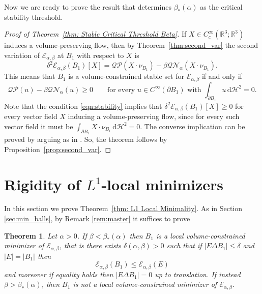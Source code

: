\documentclass[a4paper,11pt,reqno]{amsart}
\numberwithin{equation}{section}
\newtheorem{theorem}{Theorem}[section]
\theoremstyle{remark}
\theoremstyle{definition}
\newcommand{\R}{\mathbb R}
\newcommand{\dd}{\,\mathrm{d}}
\newcommand{\ene}{\mathcal{E}_{\alpha,\beta}}
\newcommand{\nl}{\mathcal{N}_{\alpha}}
\newcommand{\Htwo}{\mathcal{H}^2}
\renewcommand{\leq}{\leqslant}
\renewcommand{\geq}{\geqslant}
\begin{document}
Now we are ready to prove the result that determines $\beta_*(\alpha)$ as the critical stability threshold.

\begin{proof}[Proof of Theorem~\ref{thm: Stable Critical Threshold Beta}]
If $X\in C^\infty_c(\R^3;\R^3)$ induces a volume-preserving flow, then by Theorem~\ref{thm:second_var} the second variation of $\ene$ at $B_1$ with respect to $X$ is
	\[
		\delta^2\ene(B_1)[X] = \mathcal{QP}(X\cdot\nu_{B_1})-\beta \mathcal{Q\nl}(X\cdot\nu_{B_1}).
	\]
This means that $B_1$ is a volume-constrained stable set for $\ene$ if and only if
	\begin{equation} \label{eqn:stability}
		\mathcal{QP}(u)-\beta \mathcal{Q\nl}(u)\geq 0 \qquad \text{for every }u\in C^\infty(\partial B_1) \text{ with }\int_{\partial B_1}u\dd\Htwo=0.
	\end{equation} 
Note that the condition \eqref{eqn:stability} implies that $\delta^2\ene(B_1)[X]\geq0$ for every vector field $X$ inducing a volume-preserving flow, since for every such vector field it must be $\int_{\partial B_1} X\cdot\nu_{B_1}\dd\Htwo=0$. The converse implication can be proved by arguing as in \cite[Proof of Theorem~7.1]{FFMMM}. So, the theorem follows by Proposition~\ref{prop:second_var}.
\end{proof} 



\section{Rigidity of \texorpdfstring{$L^1$}{L1}-local minimizers}

In this section we prove Theorem~\ref{thm: L1 Local Minimality}. As in Section \ref{sec:min_balls}, by Remark \ref{rem:master} it suffices to prove
	\begin{theorem}\label{thm: L1 Local Minimality Beta} 
		Let $\alpha >0$. If $\beta < \beta_*(\alpha)$ then $B_1$ is a local volume-constrained minimizer of $\ene$, that is there exists $\delta(\alpha,\beta)>0$ such that if $|E\Delta B_1|\leq \delta$ and $|E|=|B_1|$ then
		\[
			\ene(B_1)\leq \ene(E)
		\]
and moreover if equality holds then $|E\Delta B_1|=0$ up to translation. If instead $\beta>\beta_*(\alpha)$, then $B_1$ is not a local volume-constrained minimizer of $\ene$.
	\end{theorem}
	
\end{document}

